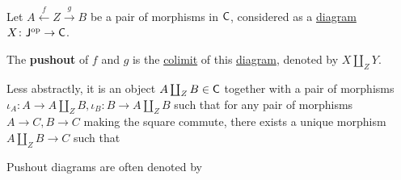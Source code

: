 \documentclass[../../main]{subfiles}
\begin{document}
\begin{definition}[Pushout]\label{def:pushout}
  Let \(A \xleftarrow{f} Z \xrightarrow{g} B\) be a pair of morphisms in \(\mathsf{C}\), considered as a \hyperref[def:diagram]{diagram} \(X\colon \mathsf{J}^{\operatorname*{op}} \to \mathsf{C}\).
  
  The \textbf{pushout} of \(f\) and \(g\) is the \hyperref[def:categorical-colimit]{colimit} of this \hyperref[def:diagram]{diagram}, denoted by \(X \coprod_{Z} Y\).

  Less abstractly, it is an object \(A \coprod_{Z} B \in \mathsf{C}\) together with a pair of morphisms \(\iota_{A}\colon A \to A \coprod_{Z} B, \iota_{B}: B \to A \coprod_{Z} B\) such that for any pair of morphisms \(A \to C, B \to  C\) making the square commute, there exists a unique morphism \(A \coprod_{Z} B \to C\) such that
  \begin{center}
  \end{center}

  Pushout diagrams are often denoted by
  \begin{center}
  \end{center}
\end{definition}
\end{document}
